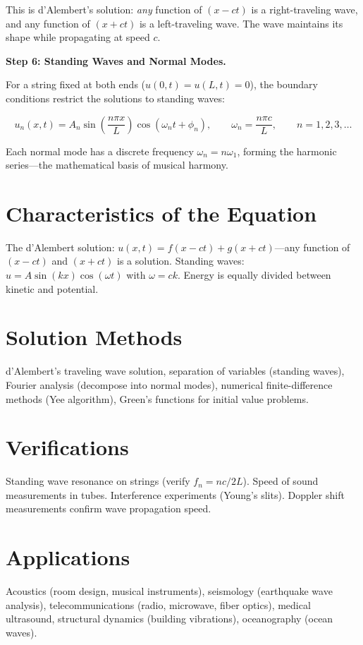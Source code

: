 This is d'Alembert's solution: \emph{any} function of $(x - ct)$ is a right-traveling wave, and any function of $(x + ct)$ is a left-traveling wave. The wave maintains its shape while propagating at speed $c$.

\textbf{Step 6: Standing Waves and Normal Modes.}

For a string fixed at both ends ($u(0,t) = u(L,t) = 0$), the boundary conditions restrict the solutions to standing waves:

\begin{equation}
u_n(x,t) = A_n\sin\!\left(\frac{n\pi x}{L}\right)\cos(\omega_n t + \phi_n), \qquad \omega_n = \frac{n\pi c}{L}, \qquad n = 1, 2, 3, \ldots
\end{equation}

Each normal mode has a discrete frequency $\omega_n = n\omega_1$, forming the harmonic series---the mathematical basis of musical harmony.

\section*{Characteristics of the Equation}

The d'Alembert solution: $u(x,t) = f(x - ct) + g(x + ct)$---any function of $(x - ct)$ and $(x + ct)$ is a solution. Standing waves: $u = A \sin(kx)\cos(\omega t)$ with $\omega = ck$. Energy is equally divided between kinetic and potential.
\section*{Solution Methods}

d'Alembert's traveling wave solution, separation of variables (standing waves), Fourier analysis (decompose into normal modes), numerical finite-difference methods (Yee algorithm), Green's functions for initial value problems.
\section*{Verifications}

Standing wave resonance on strings (verify $f_n = nc/2L$). Speed of sound measurements in tubes. Interference experiments (Young's slits). Doppler shift measurements confirm wave propagation speed.
\section*{Applications}

Acoustics (room design, musical instruments), seismology (earthquake wave analysis), telecommunications (radio, microwave, fiber optics), medical ultrasound, structural dynamics (building vibrations), oceanography (ocean waves).
